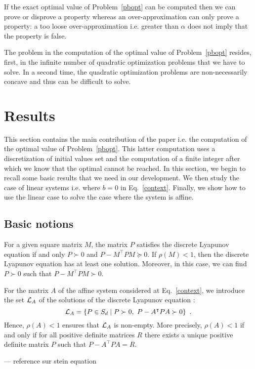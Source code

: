 \documentclass[10pt]{article}
\newcommand\ForAuthors[1]%
 {\par\smallskip                     %
  \begin{center}%
   \fbox%
   {\parbox{0.9\linewidth}%
    {\raggedright\sc--- #1}%
   }%
  \end{center}%
  \par\smallskip                     %
 }
\begin{document}
If the exact optimal value of Problem~\eqref{pbopt} can be computed then we can prove or disprove a property whereas an over-approximation can only prove a property: a too loose over-approximation i.e. greater than $\alpha$ does not imply that the property is false. 

The problem in the computation of the optimal value of Problem~\eqref{pbopt} resides, first, in the infinite number of quadratic optimization problems that we have to solve. In a second time, the quadratic optimization problems are non-necessarily concave and thus can be difficult to solve. 
\section{Results}
\label{mainresults}
This section contains the main contribution of the paper i.e. the computation of the optimal value of Problem~\eqref{pbopt}. This latter computation uses a discretization of initial values set and the computation of a finite integer after which we know that the optimal cannot be reached. In this section, we begin to recall some basic results that we need in our development. We then study the case of linear systems i.e. where $b=0$ in Eq.~\eqref{context}. Finally, we show how to use the linear case to solve the case where the system is affine.   
\subsection{Basic notions}

For a given square matrix $M$, the matrix $P$ satisfies the discrete Lyapunov equation if and only $P\succ 0$ and $P-M^\intercal P M\succeq 0$. If $\rho(M)<1$, then the discrete Lyapunov equation has at least one solution. Moreover, in this case, we can find $P\succ 0$ such that $P-M^\intercal P M\succ 0$.  

For the matrix $A$ of the affine system considered at Eq.~\eqref{context}, we introduce the set $\mathcal{L}_{A}$ of the  solutions  of the discrete Lyapunov equation :
\[
\mathcal{L}_{A}=\{P\in S_d \mid P\succ 0,\ P-A^\intercal P A\succ 0\}\enspace .
\]
Hence, $\rho(A)<1$ ensures that $\mathcal{L}_{A}$ is non-empty. More precisely, $\rho(A)<1$ if and only if for all positive definite matrices $R$ there exists a unique positive definite matrix $P$ such that $P-A^\intercal P A=R$. \ForAuthors{reference sur stein equation}
\end{document}
